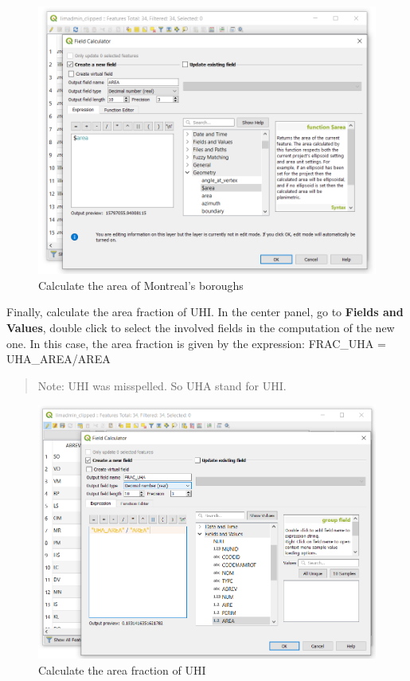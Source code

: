 \documentclass[]{book}
\theoremstyle{definition}
\theoremstyle{definition}
\theoremstyle{definition}
\theoremstyle{remark}
\begin{document}
\begin{figure}

{\centering \includegraphics[width=13.42in]{figures/Calculate_Area_Montreal} 

}

\caption{Calculate the area of Montreal's boroughs}\label{fig:unnamed-chunk-36}
\end{figure}

Finally, calculate the area fraction of UHI. In the center panel, go to
\textbf{Fields and Values}, double click to select the involved fields
in the computation of the new one. In this case, the area fraction is
given by the expression: FRAC\_UHA = UHA\_AREA/AREA

\begin{quote}
Note: UHI was misspelled. So UHA stand for UHI.
\end{quote}

\begin{figure}

{\centering \includegraphics[width=14.1in]{figures/Calculate_Area_Fraction} 

}

\caption{Calculate the area fraction of UHI}\label{fig:unnamed-chunk-37}
\end{figure}
\end{document}
